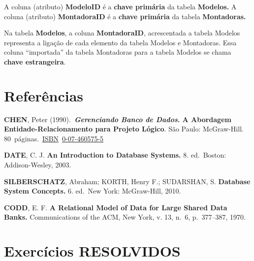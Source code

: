 \documentclass[
]{book}
\begin{document}
A coluna (atributo) \textbf{ModeloID} é a \textbf{chave primária} da tabela \textbf{Modelos.} A coluna (atributo) \textbf{MontadoraID} é a \textbf{chave primária} da tabela \textbf{Montadoras.}

Na tabela \textbf{Modelos}, a coluna \textbf{MontadoraID}, acrescentada a tabela Modelos representa a ligação de cada elemento da tabela Modelos e Montadoras. Essa coluna ``importada'' da tabela Montadoras para a tabela Modelos se chama \textbf{chave estrangeira}.

\section{Referências}\label{referuxeancias}

\textbf{CHEN}, Peter (1990).~\textbf{\emph{Gerenciando Banco de Dados}. A Abordagem Entidade-Relacionamento para Projeto Lógico}. São Paulo: McGraw-Hill. 80~páginas.~\href{https://pt.wikipedia.org/wiki/International_Standard_Book_Number}{ISBN}~\href{https://pt.wikipedia.org/wiki/Especial:Fontes_de_livros/0-07-460575-5}{0-07-460575-5}

\textbf{DATE}, C. J. \textbf{An Introduction to Database Systems.} 8. ed.~Boston: Addison-Wesley, 2003.

\textbf{SILBERSCHATZ}, Abraham; KORTH, Henry F.; SUDARSHAN, S. \textbf{Database System Concepts.} 6. ed.~New York: McGraw-Hill, 2010.

\textbf{CODD}, E. F. \textbf{A Relational Model of Data for Large Shared Data Banks.} Communications of the ACM, New York, v. 13, n.~6, p.~377--387, 1970.

\section{Exercícios RESOLVIDOS}\label{exercuxedcios-resolvidos}
\end{document}
